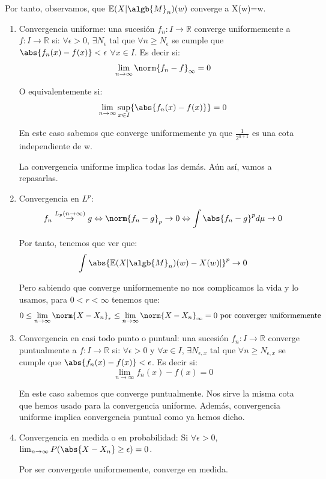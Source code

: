 \begin{problem}[1]
Por tanto, observamos, que  $\mathbb{E}(X|\algb{M}_n)(w)$ converge a X(w)=w.

\begin{enumerate}
\item Convergencia uniforme:  una sucesión $f_n:I\rightarrow \mathbb{R}$ converge uniformemente a $f:I\rightarrow \mathbb{R}$ si: $\forall \epsilon >0$,  $\exists N_{\epsilon}$ tal que $\forall n \geq N_{\epsilon}$ se cumple que $\abs{f_n(x)-f(x)}<\epsilon$ $\forall x \in I$. Es decir si:
\[
\lim_{n \rightarrow \infty} \norm{f_n - f}_{\infty} = 0
\]

O equivalentemente si:
\[
\lim_{n \rightarrow \infty} \sup_{x \in I}\{\abs{f_n(x)-f(x)} \}=0
\]

En este caso sabemos que converge uniformemente ya que $\frac{1}{2^{n+1}}$ es una cota independiente de w.

La convergencia uniforme implica todas las demás. Aún así, vamos a repasarlas.

\item Convergencia en $L^p$:
\[
f_n \stackrel{L_p (n\rightarrow \infty)}{\rightarrow} g \Leftrightarrow \norm{f_n -g}_p  \rightarrow 0 \Leftrightarrow \int{\abs{f_n -g}^pd\mu} \rightarrow 0
\]

Por tanto, tenemos que ver que:
\[
\int \abs{\mathbb{E}(X|\algb{M}_n)(w)-X(w)| }^p \rightarrow 0
\]

Pero sabiendo que converge uniformemente no nos complicamos la vida y lo usamos, para $0<r<\infty$ tenemos que:
\[
0 \leq \lim_{n \rightarrow \infty} \norm{X-X_n}_{r} \leq \lim_{n \rightarrow \infty} \norm{X-X_n}_{\infty} = 0 \text{ por converger uniformemente}
\]


\item Convergencia en casi todo punto o puntual: una sucesión $f_n:I\rightarrow \mathbb{R}$ converge puntualmente a $f:I\rightarrow \mathbb{R}$ si: $\forall \epsilon >0$ y $\forall x \in I$, $\exists N_{\epsilon, x}$ tal que $\forall n \geq N_{\epsilon, x}$ se cumple que $\abs{f_n(x)-f(x)}<\epsilon$. Es decir si:
\[
\lim_{n \rightarrow \infty} f_n(x)-f(x)=0
\]

En este caso sabemos que converge puntualmente. Nos sirve la misma cota que hemos usado para la convergencia uniforme. Además, convergencia uniforme implica convergencia puntual como ya hemos dicho.

\item Convergencia en medida o en probabilidad:
Si $\forall \epsilon >0$, $\lim_{n \rightarrow \infty}P(\abs{X-X_n}\geq \epsilon)=0$.

Por ser convergente uniformemente, converge en medida.




\end{enumerate}

\end{problem}


